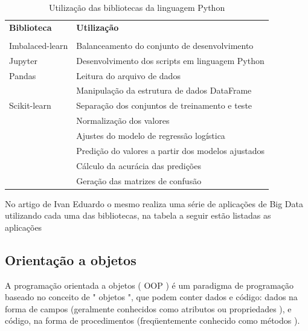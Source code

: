         \begin{table}[]
        \begin{tabular}{ll}
        \textbf{Biblioteca} & \textbf{Utilização}                                \\
                            &                                                    \\
        Imbalaced-learn     & Balanceamento do conjunto de desenvolvimento       \\
        Jupyter             & Desenvolvimento dos scripts em linguagem Python    \\
        Pandas              & Leitura do arquivo de dados                        \\
                            & Manipulação da estrutura de dados DataFrame        \\
        Scikit-learn        & Separação dos conjuntos de treinamento e teste     \\
                            & Normalização dos valores                           \\
                            & Ajustes do modelo de regressão logística           \\
                            & Predição do valores a partir dos modelos ajustados \\
                            & Cálculo da acurácia das predições                  \\
                            & Geração das matrizes de confusão                  
        \end{tabular}
        \caption{Utilização das bibliotecas da linguagem Python}
        \label{tab:my-table}
        \end{table}
        
        No artigo de Ivan Eduardo o mesmo realiza uma série de aplicações de Big Data utilizando cada uma das bibliotecas, na tabela a seguir estão listadas as aplicações \cite{Int04}
        
        \subsection{ Orienta\c{c}\~{a}o a objetos}
        \cite{Int05} A programação orientada a objetos ( OOP ) é um paradigma de programação baseado no conceito de " objetos ", que podem conter dados e código: dados na forma de campos (geralmente conhecidos como atributos ou propriedades ), e código, na forma de procedimentos (freqüentemente conhecido como métodos ).
        
